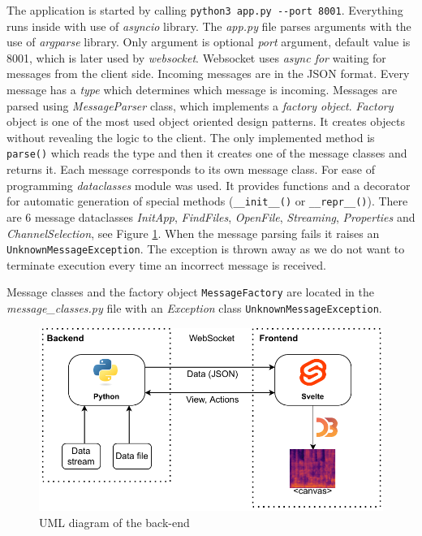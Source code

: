 The application is started by calling \verb|python3 app.py --port 8001|. Everything runs inside with use of \textit{asyncio} library. The \textit{app.py} file parses arguments with the use of \textit{argparse} library. Only argument is optional \textit{port} argument, default value is 8001, which is later used by \textit{websocket}. Websocket uses \textit{async for} waiting for messages from the client side. Incoming messages are in the JSON format. Every message has a \textit{type} which determines which message is incoming. Messages are parsed using \textit{MessageParser} class, which implements a \textit{factory object}.
\textit{Factory} object is one of the most used object oriented design patterns. It creates objects without revealing the logic to the client. The only implemented method is \verb|parse()| which reads the type and then it creates one of the message classes and returns it. Each message corresponds to its own message class. For ease of programming \textit{dataclasses} module was used. It provides functions and a decorator for automatic generation of special methods (\verb|__init__()| or \verb|__repr__()|). There are 6 message dataclasses \textit{InitApp}, \textit{FindFiles}, \textit{OpenFile}, \textit{Streaming}, \textit{Properties} and \textit{ChannelSelection}, see Figure \ref{fig:uml}. When the message parsing fails it raises an \verb|UnknownMessageException|. The exception is thrown away as we do not want to terminate execution every time an incorrect message is received.

Message classes and the factory object \verb|MessageFactory| are located in the \textit{message\_classes.py} file with an \textit{Exception} class \verb|UnknownMessageException|.

\begin{figure}
    \centering
    \includegraphics{obrazky/appstack.drawio.pdf}
    \caption{UML diagram of the back-end}
    \label{fig:uml}
\end{figure}

